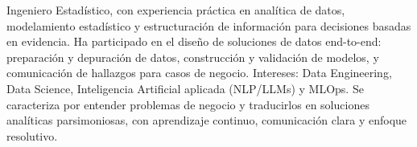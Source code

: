 
\begin{cvparagraph}

Ingeniero Estadístico, con experiencia práctica en analítica de datos, modelamiento estadístico y estructuración de información para decisiones basadas en evidencia. Ha participado en el diseño de soluciones de datos end-to-end: preparación y depuración de datos, construcción y validación de modelos, y comunicación de hallazgos para casos de negocio. Intereses: Data Engineering, Data Science, Inteligencia Artificial aplicada (NLP/LLMs) y MLOps. Se caracteriza por entender problemas de negocio y traducirlos en soluciones analíticas parsimoniosas, con aprendizaje continuo, comunicación clara y enfoque resolutivo.

\end{cvparagraph}
